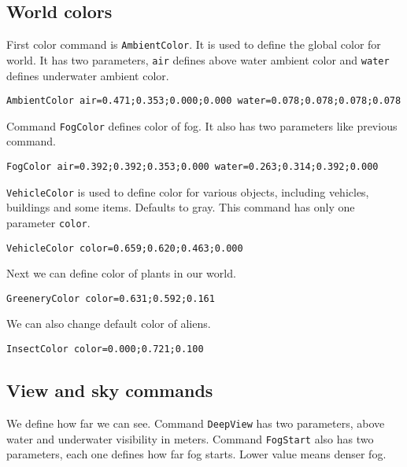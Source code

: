 

\subsection{World colors}

First color command is \verb|AmbientColor|. It is used to define the global color for world. It has two parameters, \verb|air| defines above water ambient color and \verb|water| defines underwater ambient color.

\begin{verbatim}
AmbientColor air=0.471;0.353;0.000;0.000 water=0.078;0.078;0.078;0.078
\end{verbatim}


Command \verb|FogColor| defines color of fog. It also has two parameters like previous command.

\begin{verbatim}
FogColor air=0.392;0.392;0.353;0.000 water=0.263;0.314;0.392;0.000
\end{verbatim}

\verb|VehicleColor| is used to define color for various objects, including vehicles, buildings and some items. Defaults to gray. This command has only one parameter \verb|color|.

\begin{verbatim}
VehicleColor color=0.659;0.620;0.463;0.000
\end{verbatim}

Next we can define color of plants in our world.

\begin{verbatim}
GreeneryColor color=0.631;0.592;0.161
\end{verbatim}

We can also change default color of aliens.

\begin{verbatim}
InsectColor color=0.000;0.721;0.100
\end{verbatim}


\subsection{View and sky commands}

We define how far we can see. Command \texttt{DeepView} has two parameters, above water and underwater visibility in meters. Command \texttt{FogStart} also has two parameters, each one defines how far fog starts. Lower value means denser fog.

